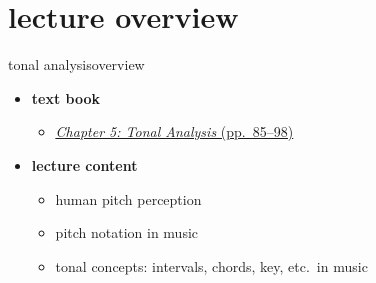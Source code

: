 

\subtitle{Part 6.1: Tonal Analysis Introduction}


	

    \section[overview]{lecture overview}
        \begin{frame}{tonal analysis}{overview}
            \begin{itemize}
                \item   \textbf{text book}  
                    \begin{itemize}
                        \item   \href{http://ieeexplore.ieee.org/xpl/articleDetails.jsp?tp=&arnumber=&}{\underline{\textit{Chapter 5: Tonal Analysis} (pp.~85--98)}}
                    \end{itemize}
                \bigskip
                \item<2->   \textbf{lecture content}
                    \begin{itemize}
                        \item<2->   human pitch perception
                        \item<3->   pitch notation in music
                        \item<4->   tonal concepts: intervals, chords, key, etc.\ in music
                    \end{itemize}
            \end{itemize}
        \end{frame}

